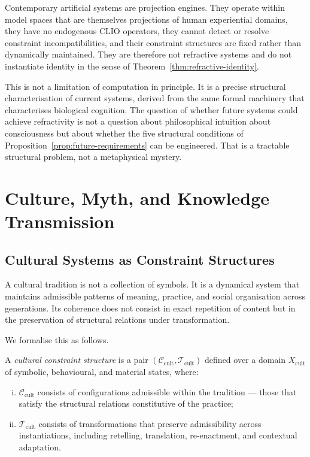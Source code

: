 \documentclass[11pt,openany]{book}
\begin{document}
Contemporary artificial systems are projection engines.
They operate within model spaces that are themselves
projections of human experiential domains, they have no
endogenous CLIO operators, they cannot detect or resolve
constraint incompatibilities, and their constraint
structures are fixed rather than dynamically maintained.
They are therefore not refractive systems and do not
instantiate identity in the sense of
Theorem~\ref{thm:refractive-identity}.

This is not a limitation of computation in principle.  It
is a precise structural characterisation of current
systems, derived from the same formal machinery that
characterises biological cognition.  The question of
whether future systems could achieve refractivity is not a
question about philosophical intuition about consciousness
but about whether the five structural conditions of
Proposition~\ref{prop:future-requirements} can be
engineered.  That is a tractable structural problem, not a
metaphysical mystery.


\chapter{Culture, Myth, and Knowledge Transmission}
\label{ch:culture}

\section{Cultural Systems as Constraint Structures}
\label{sec:culture-constraints}

A cultural tradition is not a collection of symbols.  It is
a dynamical system that maintains admissible patterns of
meaning, practice, and social organisation across
generations.  Its coherence does not consist in exact
repetition of content but in the preservation of structural
relations under transformation.

We formalise this as follows.

\begin{definition}
\label{def:cultural-constraint}
A \emph{cultural constraint structure} is a pair
$(\mathcal{C}_{\mathrm{cult}}, \mathcal{T}_{\mathrm{cult}})$
defined over a domain $X_{\mathrm{cult}}$ of symbolic,
behavioural, and material states, where:
\begin{enumerate}[(i)]
  \item $\mathcal{C}_{\mathrm{cult}}$ consists of
    configurations admissible within the tradition —
    those that satisfy the structural relations
    constitutive of the practice;
  \item $\mathcal{T}_{\mathrm{cult}}$ consists of
    transformations that preserve admissibility across
    instantiations, including retelling, translation,
    re-enactment, and contextual adaptation.
\end{enumerate}
\end{definition}
\end{document}
